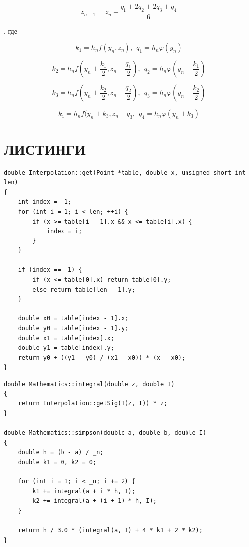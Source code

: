 \begin{equation*}
    z_{n+1} = z_n + \frac{q_1 + 2q_2 + 2q_3 + q_4}{6}
\end{equation*}

, где

\begin{equation*}
    k_1 = h_n f(y_n, z_n), ~~q_1 = h_n \varphi (y_n)
\end{equation*}

\begin{equation*}
    k_2 = h_n f (y_n + \frac{k_1}{2}, z_n + \frac{q_1}{2}),~~ q_2 = h_n \varphi(y_n + \frac{k_1}{2})
\end{equation*}

\begin{equation*}
    k_3 = h_n f (y_n + \frac{k_2}{2}, z_n + \frac{q_2}{2}), ~~q_3 = h_n \varphi(y_n + \frac{k_2}{2})
\end{equation*}

\begin{equation*}
    k_4 = h_n f (y_n + k_3, z_n + q_3, ~~q_4 = h_n \varphi(y_n + k_3)
\end{equation*}

\section{ЛИСТИНГИ}

\begin{lstlisting}[caption=Интерполяция]
double Interpolation::get(Point *table, double x, unsigned short int len)
{
    int index = -1;
    for (int i = 1; i < len; ++i) {
        if (x >= table[i - 1].x && x <= table[i].x) {
            index = i;
        }
    }

    if (index == -1) {
        if (x <= table[0].x) return table[0].y;
        else return table[len - 1].y;
    }

    double x0 = table[index - 1].x;
    double y0 = table[index - 1].y;
    double x1 = table[index].x;
    double y1 = table[index].y;
    return y0 + ((y1 - y0) / (x1 - x0)) * (x - x0);
}
\end{lstlisting}

\begin{lstlisting}[caption=Интегрирование методом парабол (Метод Симпсона)]
double Mathematics::integral(double z, double I)
{
    return Interpolation::getSig(T(z, I)) * z;
}

double Mathematics::simpson(double a, double b, double I)
{
    double h = (b - a) / _n;
    double k1 = 0, k2 = 0;

    for (int i = 1; i < _n; i += 2) {
        k1 += integral(a + i * h, I);
        k2 += integral(a + (i + 1) * h, I);
    }

    return h / 3.0 * (integral(a, I) + 4 * k1 + 2 * k2);
}
\end{lstlisting}

